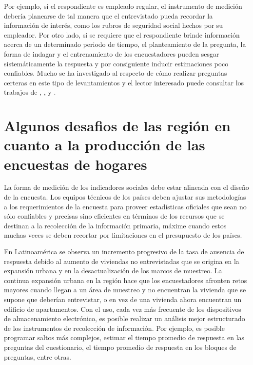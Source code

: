 \documentclass[
  12pt,
]{book}
\begin{document}
Por ejemplo, si el respondiente es empleado regular, el instrumento de medición debería planearse de tal manera que el entrevistado pueda recordar la información de interés, como los rubros de seguridad social hechos por su empleador. Por otro lado, si se requiere que el respondiente brinde información acerca de un determinado periodo de tiempo, el planteamiento de la pregunta, la forma de indagar y el entrenamiento de los encuestadores pueden sesgar sistemáticamente la respuesta y por consiguiente inducir estimaciones poco confiables. Mucho se ha investigado al respecto de cómo realizar preguntas certeras en este tipo de levantamientos y el lector interesado puede consultar los trabajos de \citet{Biemer_Lyberg_2003}, \citet{Presser_Rothgeb_Couper_Lessler_Martin_Martin_Singer_2004}, y \citet{Groves_Fowler_Couper_Lepkowski_Singer_Tourangeau_2009}.

\hypertarget{algunos-desafios-de-las-regiuxf3n-en-cuanto-a-la-producciuxf3n-de-las-encuestas-de-hogares}{%
\section{Algunos desafios de las región en cuanto a la producción de las encuestas de hogares}\label{algunos-desafios-de-las-regiuxf3n-en-cuanto-a-la-producciuxf3n-de-las-encuestas-de-hogares}}

La forma de medición de los indicadores sociales debe estar alineada con el diseño de la encuesta. Los equipos técnicos de los países deben ajustar sus metodologías a los requerimientos de la encuesta para proveer estadísticas oficiales que sean no sólo confiables y precisas sino eficientes en términos de los recursos que se destinan a la recolección de la información primaria, máxime cuando estos muchas veces se deben recortar por limitaciones en el presupuesto de los países.

En Latinoamérica se observa un incremento progresivo de la tasa de ausencia de respuesta debido al aumento de viviendas no entrevistadas que se origina en la expansión urbana y en la desactualización de los marcos de muestreo. La continua expansión urbana en la región hace que los encuestadores afronten retos mayores cuando llegan a un área de muestreo y no encuentran la vivienda que se supone que deberían entrevistar, o en vez de una vivienda ahora encuentran un edificio de apartamentos. Con el uso, cada vez más frecuente de los dispositivos de almacenamiento electrónico, es posible realizar un análisis mejor estructurado de los instrumentos de recolección de información. Por ejemplo, es posible programar saltos más complejos, estimar el tiempo promedio de respuesta en las preguntas del cuestionario, el tiempo promedio de respuesta en los bloques de preguntas, entre otras.
\end{document}
